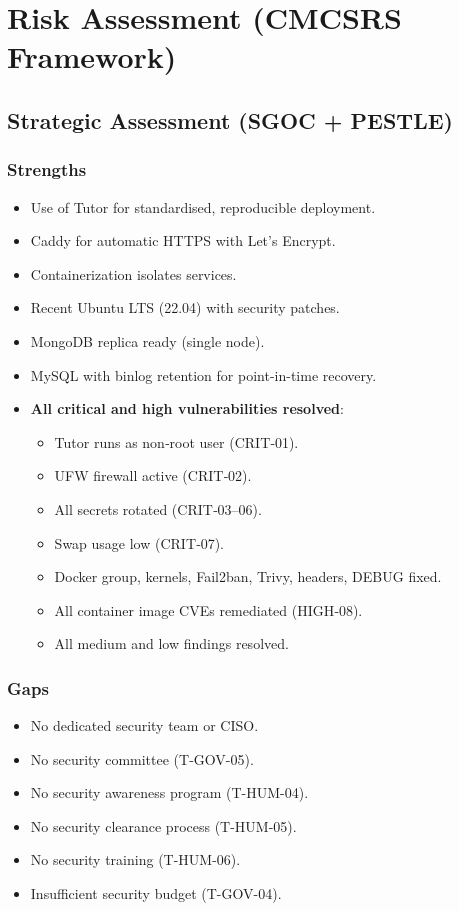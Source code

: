 \section{Risk Assessment (CMCSRS Framework)}

\subsection{Strategic Assessment (SGOC + PESTLE)}

\subsubsection{Strengths}
\begin{itemize}
    \item Use of Tutor for standardised, reproducible deployment.
    \item Caddy for automatic HTTPS with Let's Encrypt.
    \item Containerization isolates services.
    \item Recent Ubuntu LTS (22.04) with security patches.
    \item MongoDB replica ready (single node).
    \item MySQL with binlog retention for point-in-time recovery.
    \item \textbf{All critical and high vulnerabilities resolved}:
    \begin{itemize}
        \item Tutor runs as non‑root user (CRIT‑01).
        \item UFW firewall active (CRIT‑02).
        \item All secrets rotated (CRIT‑03–06).
        \item Swap usage low (CRIT‑07).
        \item Docker group, kernels, Fail2ban, Trivy, headers, DEBUG fixed.
        \item All container image CVEs remediated (HIGH‑08).
        \item All medium and low findings resolved.
    \end{itemize}
\end{itemize}

\subsubsection{Gaps}
\begin{itemize}
    \item No dedicated security team or CISO.
    \item No security committee (T-GOV-05).
    \item No security awareness program (T-HUM-04).
    \item No security clearance process (T-HUM-05).
    \item No security training (T-HUM-06).
    \item Insufficient security budget (T-GOV-04).
\end{itemize}

